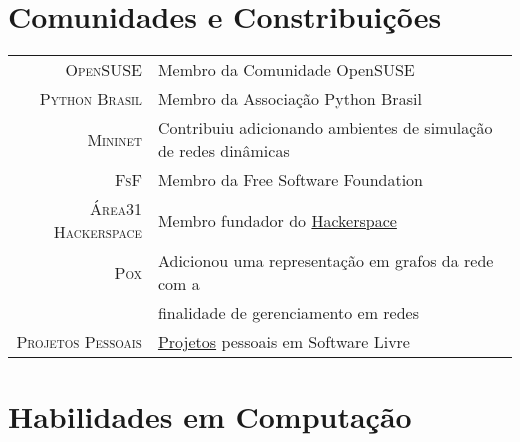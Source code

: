 \documentclass[a4paper,10pt]{article} %
\begin{document}
\section{Comunidades e Constribuições}

\begin{tabular}{rl}
\textsc{OpenSUSE}  & Membro da Comunidade OpenSUSE \\
\textsc{Python Brasil}  & Membro da Associação Python Brasil \\
\textsc{Mininet}  & Contribuiu adicionando ambientes de simulação de redes
dinâmicas \\
\textsc{FsF} & Membro da Free Software Foundation \\
\textsc{Área31 Hackerspace} & Membro fundador do
\href{http://area31.net.br}{Hackerspace} \\
\textsc{Pox} & Adicionou uma representação em grafos da rede com a
\\ & finalidade de gerenciamento em redes \\
\textsc{Projetos Pessoais} & \href{http://github.com/pantuza}{Projetos}
pessoais em Software Livre \\
\end{tabular}













\section{Habilidades em Computação}
\end{document}
